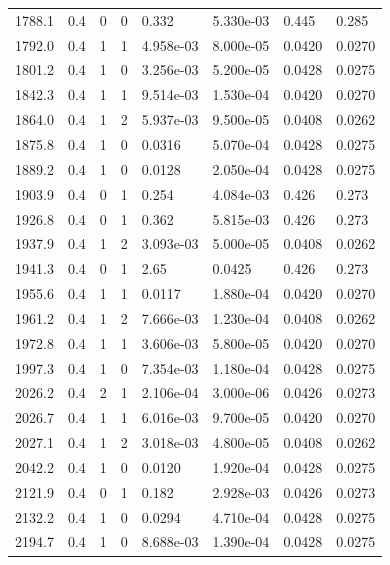 \documentclass[preview]{standalone}
\begin{document}
{{{\begin{tabular}{L{1.2cm}C{1.2cm} C{0.3cm}C{0.5cm} C{1.4cm}C{1.4cm} C{1.4cm}C{1.4cm}}
  1788.1  &   0.4  & 0     &  0 &  0.332  & 5.330e-03  & 0.445 &  0.285   \\ 
  1792.0  &   0.4  & 1     &  1 &  4.958e-03  & 8.000e-05  & 0.0420 &  0.0270   \\ 
  1801.2  &   0.4  & 1     &  0 &  3.256e-03  & 5.200e-05  & 0.0428 &  0.0275   \\ 
  1842.3  &   0.4  & 1     &  1 &  9.514e-03  & 1.530e-04  & 0.0420 &  0.0270   \\ 
  1864.0  &   0.4  & 1     &  2 &  5.937e-03  & 9.500e-05  & 0.0408 &  0.0262   \\ 
  1875.8  &   0.4  & 1     &  0 &  0.0316  & 5.070e-04  & 0.0428 &  0.0275   \\ 
  1889.2  &   0.4  & 1     &  0 &  0.0128  & 2.050e-04  & 0.0428 &  0.0275   \\ 
  1903.9  &   0.4  & 0     &  1 &  0.254  & 4.084e-03  & 0.426 &  0.273   \\ 
  1926.8  &   0.4  & 0     &  1 &  0.362  & 5.815e-03  & 0.426 &  0.273   \\ 
  1937.9  &   0.4  & 1     &  2 &  3.093e-03  & 5.000e-05  & 0.0408 &  0.0262   \\ 
  1941.3  &   0.4  & 0     &  1 &  2.65  & 0.0425  & 0.426 &  0.273   \\ 
  1955.6  &   0.4  & 1     &  1 &  0.0117  & 1.880e-04  & 0.0420 &  0.0270   \\ 
  1961.2  &   0.4  & 1     &  2 &  7.666e-03  & 1.230e-04  & 0.0408 &  0.0262   \\ 
  1972.8  &   0.4  & 1     &  1 &  3.606e-03  & 5.800e-05  & 0.0420 &  0.0270   \\ 
  1997.3  &   0.4  & 1     &  0 &  7.354e-03  & 1.180e-04  & 0.0428 &  0.0275   \\ 
  2026.2  &   0.4  & 2     &  1 &  2.106e-04  & 3.000e-06  & 0.0426 &  0.0273   \\ 
  2026.7  &   0.4  & 1     &  1 &  6.016e-03  & 9.700e-05  & 0.0420 &  0.0270   \\ 
  2027.1  &   0.4  & 1     &  2 &  3.018e-03  & 4.800e-05  & 0.0408 &  0.0262   \\ 
  2042.2  &   0.4  & 1     &  0 &  0.0120  & 1.920e-04  & 0.0428 &  0.0275   \\ 
  2121.9  &   0.4  & 0     &  1 &  0.182  & 2.928e-03  & 0.0426 &  0.0273   \\ 
  2132.2  &   0.4  & 1     &  0 &  0.0294  & 4.710e-04  & 0.0428 &  0.0275   \\ 
  2194.7  &   0.4  & 1     &  0 &  8.688e-03  & 1.390e-04  & 0.0428 &  0.0275   \\ 

\end{tabular}}}}
\end{document}

